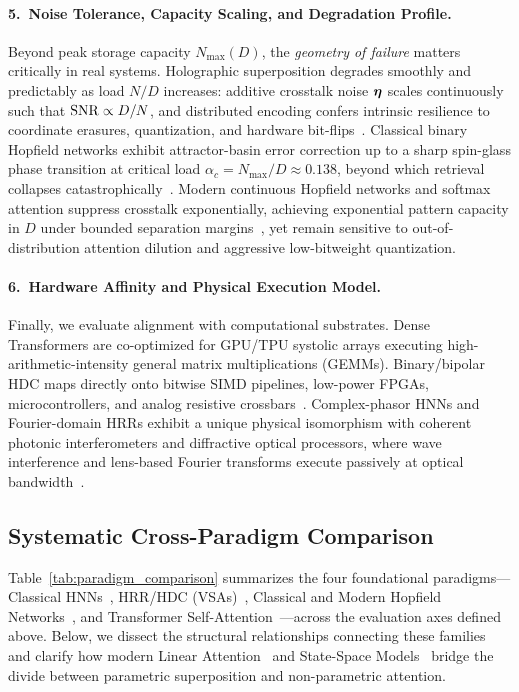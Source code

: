\paragraph{5.\ Noise Tolerance, Capacity Scaling, and Degradation Profile.}
Beyond peak storage capacity $N_{\max}(D)$, the \emph{geometry of failure} matters critically in real systems.
Holographic superposition degrades smoothly and predictably as load $N/D$ increases: additive crosstalk noise $\boldsymbol{\eta}$ scales continuously such that $\mathrm{SNR} \propto D/N$, and distributed encoding confers intrinsic resilience to coordinate erasures, quantization, and hardware bit-flips~\cite{FRADY_CAPACITY_VSA,KLEYKO_VSA_SURVEY}.
Classical binary Hopfield networks exhibit attractor-basin error correction up to a sharp spin-glass phase transition at critical load $\alpha_c = N_{\max}/D \approx 0.138$, beyond which retrieval collapses catastrophically~\cite{HOPFIELD_1982_ASSOCIATIVE,AMIT_1985_HOPFIELD_CAPACITY}.
Modern continuous Hopfield networks and softmax attention suppress crosstalk exponentially, achieving exponential pattern capacity in $D$ under bounded separation margins~\cite{RAMSAUER_MODERN_HOPFIELD}, yet remain sensitive to out-of-distribution attention dilution and aggressive low-bitweight quantization.

\paragraph{6.\ Hardware Affinity and Physical Execution Model.}
Finally, we evaluate alignment with computational substrates.
Dense Transformers are co-optimized for GPU/TPU systolic arrays executing high-arithmetic-intensity general matrix multiplications (GEMMs).
Binary/bipolar HDC maps directly onto bitwise SIMD pipelines, low-power FPGAs, microcontrollers, and analog resistive crossbars~\cite{RAHIMI_HDC_EDGE,KARUNARATNE_2020_PCM_HDC}.
Complex-phasor HNNs and Fourier-domain HRRs exhibit a unique physical isomorphism with coherent photonic interferometers and diffractive optical processors, where wave interference and lens-based Fourier transforms execute passively at optical bandwidth~\cite{SHEN_PHOTONIC_MZI,LIN_DIFFRACTIVE_OPTICAL_NN}.

\subsection{Systematic Cross-Paradigm Comparison}\label{sec:comparison:table}

Table~\ref{tab:paradigm_comparison} summarizes the four foundational paradigms---Classical HNNs~\cite{SUTHERLAND_1990_HNN}, HRR/HDC (VSAs)~\cite{PLATE_1995_HRR,KANERVA_2009_HDC,SCHLEGEL_VSA_COMPARISON}, Classical and Modern Hopfield Networks~\cite{HOPFIELD_1982_ASSOCIATIVE,RAMSAUER_MODERN_HOPFIELD}, and Transformer Self-Attention~\cite{VASWANI_TRANSFORMER}---across the evaluation axes defined above.
Below, we dissect the structural relationships connecting these families and clarify how modern Linear Attention~\cite{KATHAROPOULOS_2020_LINEAR_TRANSFORMER} and State-Space Models~\cite{GU_SSM_S4_MAMBA} bridge the divide between parametric superposition and non-parametric attention.

